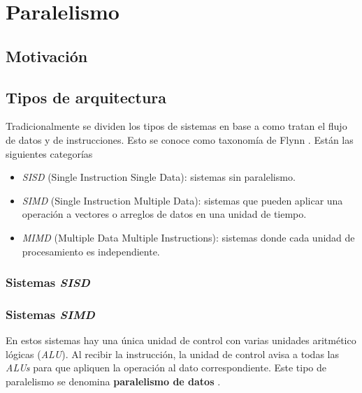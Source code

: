 \chapter{Paralelismo}

\section{Motivación}

\section{Tipos de arquitectura}

Tradicionalmente se dividen los tipos de sistemas en base a como tratan el flujo
de datos y de instrucciones. Esto se conoce como taxonomía de Flynn
\cite{Pacheco2011}. Están las siguientes  categorías

\begin{itemize}
    \item \textit{SISD} (Single Instruction Single Data): sistemas
    sin paralelismo.
    
    \item \textit{SIMD} (Single Instruction Multiple Data):
    sistemas que pueden aplicar una operación a vectores o arreglos de datos en
    una unidad de tiempo.
    
    \item \textit{MIMD} (Multiple Data Multiple Instructions):
    sistemas donde cada unidad de procesamiento es independiente.
\end{itemize}

\subsection{Sistemas \textit{SISD}}


\subsection{Sistemas \textit{SIMD}}

En estos sistemas hay una única unidad de control con varias unidades aritmético lógicas (\textit{ALU}). Al recibir la instrucción, la unidad de control avisa a
todas las \textit{ALUs} para que apliquen la operación al dato correspondiente.
Este tipo de paralelismo se denomina \textbf{paralelismo de datos}
.

